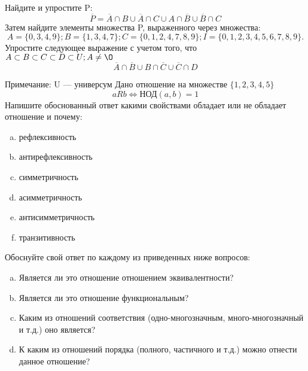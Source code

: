 \documentclass[10pt]{exam}
\begin{document}
\begin{questions}
\question
Найдите и упростите P:
\begin{equation*}
\overline{P} = \overline{A} \cap B \cup \overline{A} \cap C \cup A \cap \overline{B} \cup \overline{B} \cap C
\end{equation*}
Затем найдите элементы множества P, выраженного через множества:
\begin{equation*}
A = \{0, 3, 4, 9\}; 
B = \{1, 3, 4, 7\};
C = \{0, 1, 2, 4, 7, 8, 9\};
I = \{0, 1, 2, 3, 4, 5, 6, 7, 8, 9\}.
\end{equation*}\question
Упростите следующее выражение с учетом того, что $A\subset B \subset C \subset D \subset U; A \neq \O$
\begin{equation*}
\overline{A} \cap \overline{B} \cup B \cap \overline{C} \cup \overline{C} \cap D
\end{equation*}

Примечание: U — универсум\question
Дано отношение на множестве $\{1, 2, 3, 4, 5\}$ 
\begin{equation*}
aRb \iff  \text{НОД}(a,b) =1
\end{equation*}
Напишите обоснованный ответ какими свойствами обладает или не обладает отношение и почему:   
\begin{enumerate} [a)]\setcounter{enumi}{0}
\item рефлексивность
\item антирефлексивность
\item симметричность
\item асимметричность
\item антисимметричность
\item транзитивность
\end{enumerate}

Обоснуйте свой ответ по каждому из приведенных ниже вопросов:
\begin{enumerate} [a)]\setcounter{enumi}{0}
    \item Является ли это отношение отношением эквивалентности?
    \item Является ли это отношение функциональным?
    \item Каким из отношений соответствия (одно-многозначным, много-многозначный и т.д.) оно является?
    \item К каким из отношений порядка (полного, частичного и т.д.) можно отнести данное отношение?
\end{enumerate}



\end{questions}
\end{document}
